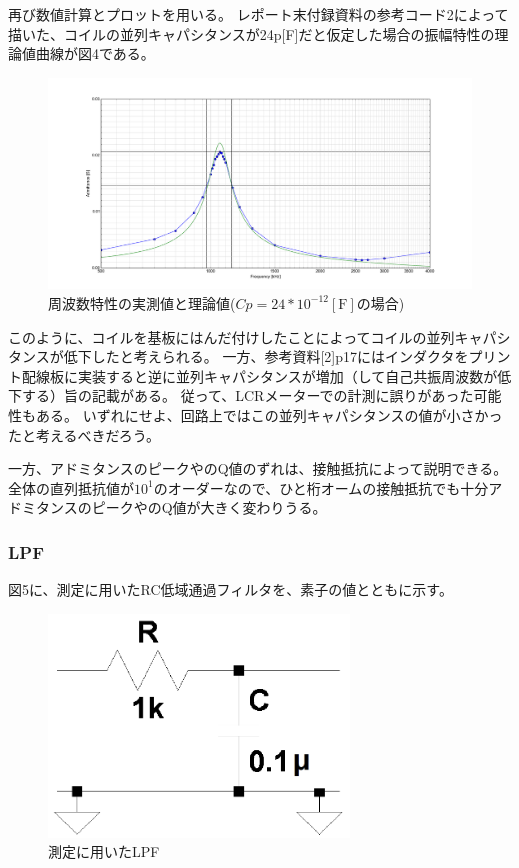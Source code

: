 \documentclass[10pt,a4j,dvipdfmx]{jsarticle}
\begin{document}
再び数値計算とプロットを用いる。
レポート末付録資料の参考コード2によって描いた、コイルの並列キャパシタンスが24p[\si{\farad}]だと仮定した場合の振幅特性の理論値曲線が図4である。

\begin{figure}[H]
  \centering
  \includegraphics[width=16cm]{P1analyze.png}
  \caption{周波数特性の実測値と理論値($Cp=24*10^{-12}\left[\si{\farad}\right]$の場合)}
\end{figure}

このように、コイルを基板にはんだ付けしたことによってコイルの並列キャパシタンスが低下したと考えられる。
一方、参考資料[2]p17にはインダクタをプリント配線板に実装すると逆に並列キャパシタンスが増加（して自己共振周波数が低下する）旨の記載がある。
従って、LCRメーターでの計測に誤りがあった可能性もある。
いずれにせよ、回路上ではこの並列キャパシタンスの値が小さかったと考えるべきだろう。

一方、アドミタンスのピークやのQ値のずれは、接触抵抗によって説明できる。全体の直列抵抗値が$10^{1}$のオーダーなので、ひと桁オームの接触抵抗でも十分アドミタンスのピークやのQ値が大きく変わりうる。

\subsubsection{LPF}
図5に、測定に用いたRC低域通過フィルタを、素子の値とともに示す。
\begin{figure}[H]
  \centering
  \includegraphics[width=8cm]{LPF.png}
  \caption{測定に用いたLPF}
\end{figure}
\end{document}
